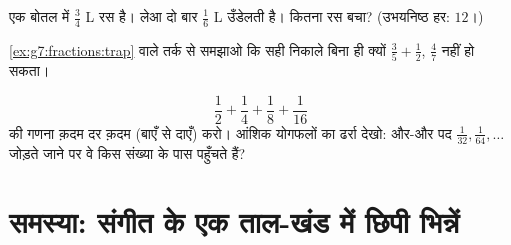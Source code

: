 \begin{exercise}[$\star\star$]\label{exo:g7:fractions:10}
एक बोतल में $\frac34$ L रस है। लेआ दो बार $\frac16$ L उँडेलती है।
कितना रस बचा? (उभयनिष्ठ हर: $12$।)
\end{exercise}

\begin{exercise}[$\star\star$]\label{exo:g7:fractions:11}
\cref{ex:g7:fractions:trap} वाले तर्क से समझाओ कि सही  निकाले
बिना ही क्यों $\frac35 + \frac12$, $\frac{4}{7}$ नहीं हो सकता।
\end{exercise}

\begin{exercise}[$\star\star\star$]\label{exo:g7:fractions:12}
\[
\frac12 + \frac14 + \frac18 + \frac{1}{16}
\]
की गणना क़दम दर क़दम (बाएँ से दाएँ) करो। आंशिक योगफलों का ढर्रा
देखो: और-और पद $\frac{1}{32}, \frac{1}{64}, \dots$ जोड़ते जाने पर
वे किस संख्या के पास पहुँचते हैं?
\end{exercise}

\section{समस्या: संगीत के एक ताल-खंड में छिपी भिन्नें}

